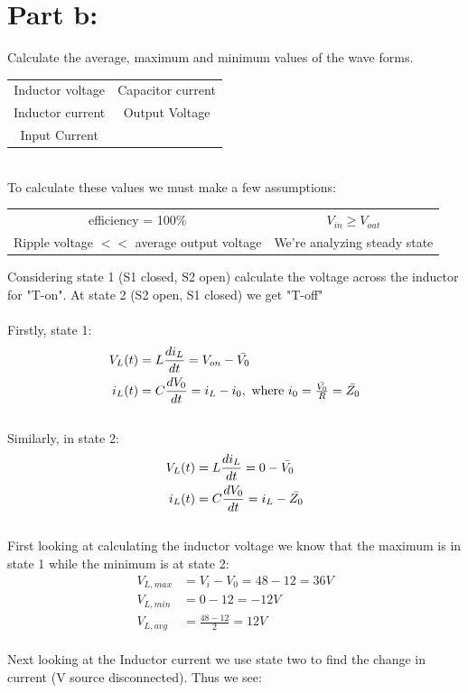 \documentclass{article}
\begin{document}
\section*{Part b:}
Calculate the average, maximum and minimum values of the wave forms.
\begin{center}
\begin{tabular}{ c   c }
    Inductor voltage & Capacitor current\\ 
    Inductor current &  Output Voltage\\  
    Input Current\\    
\end{tabular}
\end{center}
\\ To calculate these values we must make a few assumptions:
\begin{center}
    \begin{tabular}{c   c}
    efficiency = 100\% & $V_{in} \geq V_{out}$ \\
    Ripple voltage $<<$ average output voltage & We're analyzing steady state \\
    \end{tabular}
\end{center}
Considering state 1 (S1 closed, S2 open) calculate the voltage across the inductor for "T-on". At state 2 (S2 open, S1 closed) we get "T-off" \\
\\ Firstly, state 1:
\begin{align*}
    V_L(t) &= L \frac{di_L}{dt} = V_{on} - \Bar{V_0} \\
    i_L(t) &= C \frac{dV_0}{dt} = i_L - i_0,\mbox{ where $i_0 = \frac{\Bar{V_0}}{R} = \Bar{Z_0}$}
\end{align*}
\\ Similarly, in state 2:
\begin{align*}
        V_L(t) &= L \frac{di_L}{dt} = 0 - \Bar{V_0} \\
    i_L(t) &= C \frac{dV_0}{dt} = i_L - \Bar{Z_0}
\end{align*}
\\First looking at calculating the inductor voltage we know that the maximum is in state 1 while the minimum is at state 2: 
\begin{align*}
    V_{L,max} &= V_i - V_0 = 48 - 12 = 36V \\
    V_{L,min} &= 0 - 12 = -12V \\
    V_{L,avg} &= \frac{48-12}{2} = 12V
\end{align*}
\\ Next looking at the Inductor current we use state two to find the change in current (V source disconnected). Thus we see:
\end{document}
